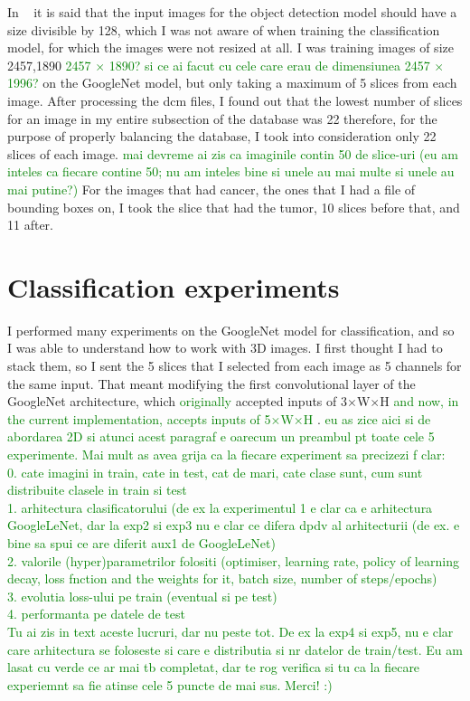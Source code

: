 In ~\cite{carte8} it is said that the input images for the object detection model should have a size divisible by 128, which I was not aware of when training the classification model, for which the images were not resized at all. I was training images of size 2457,1890 
\textcolor{green}{2457 $\times$ 1890?} 
\textcolor{green}{si ce ai facut cu cele care erau de dimensiunea 2457 $\times$ 1996?} 
on the GoogleNet model, but only taking a maximum of 5 slices from each image. After processing the dcm files, I found out that the lowest number of slices for an image in my entire subsection of the database was 22 therefore, for the purpose of properly balancing the database, I took into consideration only 22 slices of each image. 
\textcolor{green}{mai devreme ai zis ca imaginile contin 50 de slice-uri (eu am inteles ca fiecare contine 50; nu am inteles bine si unele au mai multe si unele au mai putine?)} 
For the images that had cancer, the ones that I had a file of bounding boxes on, I took the slice that had the tumor, 10 slices before that, and 11 after.

\section{Classification experiments}

I performed many experiments on the GoogleNet model for classification, and so I was able to understand how to work with 3D images. I first thought I had to stack them, so I sent the 5 slices that I selected from each image as 5 channels for the same input. That meant modifying the first convolutional layer of the GoogleNet architecture, which \textcolor{green}{originally} accepted inputs of 3$\times$W$\times$H 
\textcolor{green}{and now, in the current implementation, accepts inputs of 5$\times$W$\times$H}
. 
\textcolor{green}{eu as zice aici si de abordarea 2D si atunci acest paragraf e oarecum un preambul pt toate cele 5 experimente. Mai mult as avea grija ca la fiecare experiment sa precizezi f clar:\\
0. cate imagini in train, cate in test, cat de mari, cate clase sunt, cum sunt distribuite clasele in train si test\\
1. arhitectura clasificatorului (de ex la experimentul 1 e clar ca e arhitectura GoogleLeNet, dar la exp2 si exp3 nu e clar ce difera dpdv al arhitecturii (de ex. e bine sa spui ce are diferit aux1 de GoogleLeNet)\\
2. valorile (hyper)parametrilor folositi (optimiser, learning rate, policy of learning decay, loss fnction and the weights for it, batch size, number of steps/epochs)\\
3. evolutia loss-ului pe train (eventual si pe test)\\
4. performanta pe datele de test\\
Tu ai zis in text aceste lucruri, dar nu peste tot. De ex la exp4 si exp5, nu e clar care arhitectura se foloseste si care e distributia si nr datelor de train/test. Eu am lasat cu verde ce ar mai tb completat, dar te rog verifica si tu ca la fiecare experiemnt sa fie atinse cele 5 puncte de mai sus. Merci! :)
}


